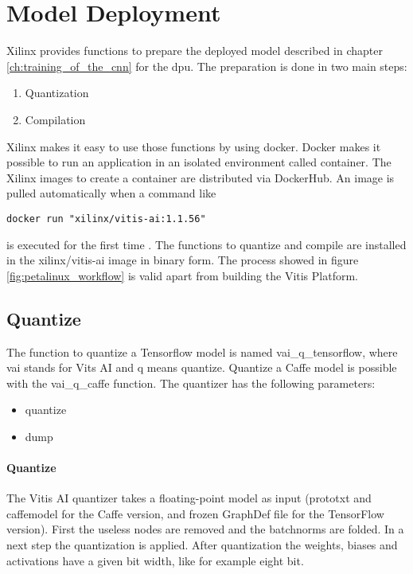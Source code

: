 \section{Model Deployment}
\label{sec:embedded_platform:model_deployment}
Xilinx provides functions to prepare the deployed model described in chapter \ref{ch:training_of_the_cnn} for the \acrshort{dpu}.
The preparation is done in two main steps:
\begin{enumerate}
	\item Quantization
	\item Compilation
\end{enumerate}
Xilinx makes it easy to use those functions by using docker.
Docker makes it possible to run an application in an isolated environment called container.
The Xilinx images to create a container are distributed via DockerHub.
An image is pulled automatically when a command like
\begin{lstlisting}[style=bash, caption={}, label=lst:pull_img]
  docker run "xilinx/vitis-ai:1.1.56"
\end{lstlisting}
is executed for the first time \cite{docker_overview}.
The functions to quantize and compile are installed in the xilinx/vitis-ai image in binary form.
The process showed in figure \ref{fig:petalinux_workflow} is valid apart from building the Vitis Platform.

\subsection{Quantize}
\label{subsec:embedded_platform:model_deployment:quantize}
The function to quantize a Tensorflow model is named vai\_q\_tensorflow, where vai stands for Vits AI and q means quantize.
Quantize a Caffe model is possible with the vai\_q\_caffe function.
The quantizer has the following parameters:
\begin{itemize}
	\item quantize
	\item dump
\end{itemize}

\paragraph{Quantize}
The Vitis AI quantizer takes a floating-point model as input (prototxt and caffemodel for the
Caffe version, and frozen GraphDef file for the TensorFlow version).
First the useless nodes are removed and the batchnorms are folded.
In a next step the quantization is applied.
After quantization the weights, biases and activations have a given bit width, like for example eight bit.

